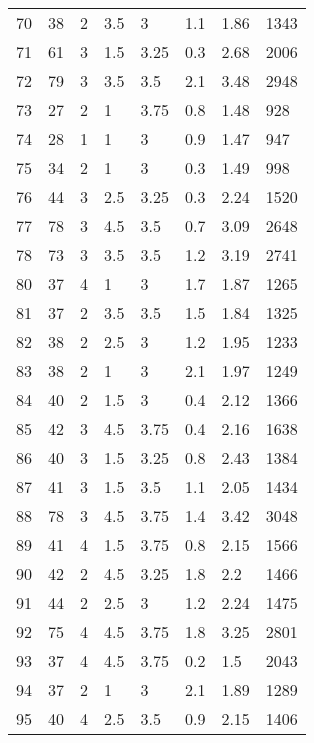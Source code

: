 \begin{table*}[h!]
\begin{tabular*}{\linewidth}{p{40pt}<{\centering}p{30pt}<{\centering}
    p{30pt}<{\centering}p{40pt}<{\centering}p{50pt}<{\centering}p{70pt}<{\centering}
    p{60pt}<{\centering}p{50pt}<{\centering}}
    70 & 38 & 2 & 3.5 & 3 & 1.1 & 1.86 & 1343 \\
    71 & 61 & 3 & 1.5 & 3.25 & 0.3 & 2.68 & 2006 \\
    72 & 79 & 3 & 3.5 & 3.5 & 2.1 & 3.48 & 2948 \\
    73 & 27 & 2 & 1 & 3.75 & 0.8 & 1.48 & 928 \\
    74 & 28 & 1 & 1 & 3 & 0.9 & 1.47 & 947 \\
    75 & 34 & 2 & 1 & 3 & 0.3 & 1.49 & 998 \\
    76 & 44 & 3 & 2.5 & 3.25 & 0.3 & 2.24 & 1520 \\
    77 & 78 & 3 & 4.5 & 3.5 & 0.7 & 3.09 & 2648 \\
    78 & 73 & 3 & 3.5 & 3.5 & 1.2 & 3.19 & 2741 \\
    80 & 37 & 4 & 1 & 3 & 1.7 & 1.87 & 1265 \\
    81 & 37 & 2 & 3.5 & 3.5 & 1.5 & 1.84 & 1325 \\
    82 & 38 & 2 & 2.5 & 3 & 1.2 & 1.95 & 1233 \\
    83 & 38 & 2 & 1 & 3 & 2.1 & 1.97 & 1249 \\
    84 & 40 & 2 & 1.5 & 3 & 0.4 & 2.12 & 1366 \\
    85 & 42 & 3 & 4.5 & 3.75 & 0.4 & 2.16 & 1638 \\
    86 & 40 & 3 & 1.5 & 3.25 & 0.8 & 2.43 & 1384 \\
    87 & 41 & 3 & 1.5 & 3.5 & 1.1 & 2.05 & 1434 \\
    88 & 78 & 3 & 4.5 & 3.75 & 1.4 & 3.42 & 3048 \\
    89 & 41 & 4 & 1.5 & 3.75 & 0.8 & 2.15 & 1566 \\
    90 & 42 & 2 & 4.5 & 3.25 & 1.8 & 2.2 & 1466 \\
    91 & 44 & 2 & 2.5 & 3 & 1.2 & 2.24 & 1475 \\
    92 & 75 & 4 & 4.5 & 3.75 & 1.8 & 3.25 & 2801 \\
    93 & 37 & 4 & 4.5 & 3.75 & 0.2 & 1.5 & 2043 \\
    94 & 37 & 2 & 1 & 3 & 2.1 & 1.89 & 1289 \\
    95 & 40 & 4 & 2.5 & 3.5 & 0.9 & 2.15 & 1406 \\
    \bottomrule
  \end{tabular*}
  \label{Ap3}
\end{table*}

